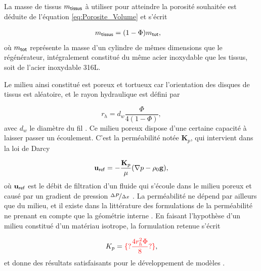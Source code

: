 La masse de tissus $m_{\sf tissus}$ à utiliser pour atteindre la porosité souhaitée est déduite de l'équation \eqref{eq:Porosite_Volume} et s'écrit 

\begin{align}
	m_{\sf tissus} &= (1-\Phi) m_{\sf tot}, \label{eq:MasseTissus_Porosite}
\end{align}
où $m_{\sf tot}$ représente la masse d'un cylindre de mêmes dimensions que le régénérateur, intégralement constitué du même acier inoxydable que les tissus, soit de l'acier inoxydable 316L.

Le milieu ainsi constitué est poreux et tortueux car l'orientation des disques de tissus est aléatoire, et le rayon hydraulique est défini par  %

\begin{equation}
	r_h = d_w\frac{\Phi}{4(1-\Phi)},
	\label{eq:DefRayonHydrauGantois}
\end{equation}
avec $d_w$ le diamètre du fil \cite{swift_thermoacoustics_2017}. Ce milieu poreux dispose d'une certaine capacité à laisser passer un écoulement. C'est la perméabilité notée $\mathbf K_p$, qui intervient dans la loi de Darcy

\begin{equation}
	\mathbf u_{\sf ref} = -\frac{\mathbf K_p}{\mu} (\nabla p - \rho_0 \mathbf g),
	\label{eq:DefPermeabilite_Wikipedia}
\end{equation}
où $\mathbf u_{\sf ref}$ est le débit de filtration d'un fluide qui s'écoule dans le milieu poreux et causé par un gradient de pression $\nicefrac{\Delta P}{\Delta x}$ \cite{nield_convection_2013, dullien_porous_1992}. La perméabilité ne dépend par ailleurs que du milieu, et il existe dans la littérature des formulations de la perméabilité ne prenant en compte que la géométrie interne \cite{dullien_porous_1992}. En faisant l'hypothèse d'un milieu constitué d'un matériau isotrope, la formulation retenue s'écrit

\begin{equation}
	K_p = \textcolor{red}{\{?\frac{4 r_h^2 \Phi}{8}?\}},
	\label{eq:DefPermeabilite_LISN}
\end{equation}
et donne des résultats satisfaisants pour le développement de modèles \cite{hireche_experimental_2020, baltean_gravity_2025}.\smallskip


